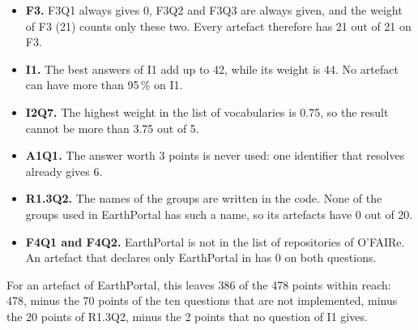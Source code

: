 \documentclass[11pt,a4paper]{article}
\begin{document}
\begin{itemize}
  \item \textbf{F3.} F3Q1 always gives 0, F3Q2 and F3Q3 are always given, and the weight of F3 (21)
    counts only these two. Every artefact therefore has 21 out of 21 on F3.
  \item \textbf{I1.} The best answers of I1 add up to 42, while its weight is 44. No artefact can
    have more than 95\,\% on I1.
  \item \textbf{I2Q7.} The highest weight in the list of vocabularies is 0.75, so the result cannot
    be more than 3.75 out of 5.
  \item \textbf{A1Q1.} The answer worth 3 points is never used: one identifier that resolves
    already gives 6.
  \item \textbf{R1.3Q2.} The names of the groups are written in the code. None of the groups used
    in EarthPortal has such a name, so its artefacts have 0 out of 20.
  \item \textbf{F4Q1 and F4Q2.} EarthPortal is not in the list of repositories of O'FAIRe. An
    artefact that declares only EarthPortal in  has 0 on both questions.
\end{itemize}

For an artefact of EarthPortal, this leaves 386 of the 478 points within reach: 478, minus the 70
points of the ten questions that are not implemented, minus the 20 points of R1.3Q2, minus the
2 points that no question of I1 gives.
\end{document}
